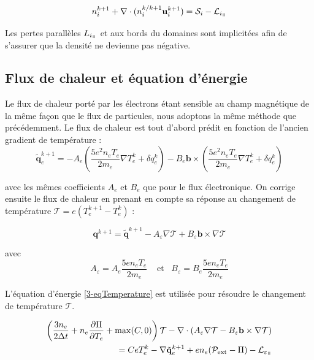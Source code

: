 \begin{refsection}
\begin{equation}
n_i^{k+1}+\nabla\cdot(n_i^{k/k+1}\mathbf u_i^{k+1})=\mathcal S_i-\mathcal
L_{i_\para}
\end{equation}

Les pertes parallèles $L_{i_\para}$ et aux bords du
domaines sont implicitées afin de s'assurer que la densité ne devienne pas
négative.

\subsection{Flux de chaleur et équation d'énergie}

Le flux de chaleur porté par les électrons étant sensible au champ magnétique de
la même façon que le flux de particules, nous adoptons la même méthode que
précédemment. Le flux de chaleur est tout d'abord prédit en fonction de
l'ancien gradient de température :
\begin{equation}
\label{3-eqChaleurPonderee}
\tilde{\mathbf{q}}_e^{k+1}=-A_e(
\frac{5e^2n_eT_e}{2m_e}\nabla T_e^k+\delta q_e^k)-B_e\mathbf
b\times(\frac{5e^2n_eT_e}{2m_e}\nabla T_e^k +\delta q_e^k)
\end{equation}

avec les mêmes coefficients $A_e$ et $B_e$ que pour le flux électronique. On
corrige ensuite le flux de chaleur en prenant en compte sa réponse au changement
de température $\mathcal T=e(T_e^{k+1}-T_e^k)$ :

\begin{equation}
\label{3-eqCorrectionVitesse}
\mathbf q^{k+1} = \tilde{\mathbf q}^{k+1}-A_\varepsilon\nabla
\mathcal T+B_\varepsilon\mathbf b\times\nabla
\mathcal T
\end{equation}

avec 
\begin{equation*}
\label{3-coefficientsChaleur}
A_\varepsilon=A_e\frac{5en_eT_e}{2m_e}\;\;\;\;\text{et}\;\;\;B_\varepsilon=B_e\frac{5en_eT_e}{2m_e}
\end{equation*}

L'équation d'énergie \eqref{3-eqTemperature} est utilisée pour résoudre le
changement de température $\mathcal T$. 

\begin{equation}
\label{3-eqTemperature2}
\begin{split}
\left(\frac{3n_e}{2\Delta
t}+n_e\frac{\partial\Pi}{\partial T_e}+\max(C,0)\right)\mathcal T
-\nabla\cdot\left(A_\varepsilon\nabla\mathcal T- B_\varepsilon\mathbf
b\times\nabla\mathcal T\right)\\ =  C eT_e^k -\nabla\tilde{\mathbf q}_e^{k+1}+
en_e(\mathcal{P}_\text{ext}-\Pi)-\mathcal L_{\varepsilon_\para}
\end{split}\end{equation}


\end{refsection}

